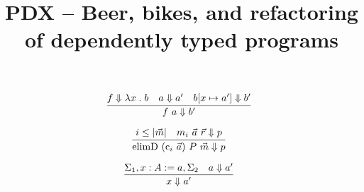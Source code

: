 \documentclass{article}
\title{PDX -- Beer, bikes, and refactoring of dependently typed programs}
\begin{document}
\maketitle

$$
\infer
  []
  {\whnf{\app{f}{a}}{b'}}
{
  \whnf{f}{\lam{x}{b}}
  &
  \whnf{a}{a'}
  &
  \whnf{\sub{b}{x}{a'}}{b'}
}
$$

$$
\infer
  []
  {\whnf{\con{elimD}~(\con{c}_i~\vec{a})~P~\vec{m}}{p}}
{
  i \leq |\vec{m}|
  &
  \whnf{m_i~\vec{a}~\vec{r}}{p}
}
$$


$$
\infer
  []
  {\whnf{x}{a'}}
{
  \Sigma_1, \sigd{x}{A}{a}, \Sigma_2
  &
  \whnf{a}{a'}
}
$$
\end{document}
